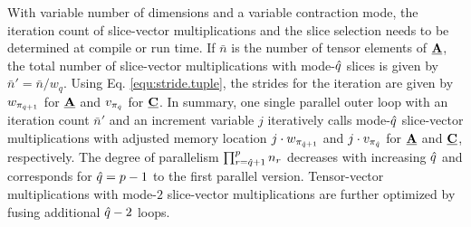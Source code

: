 With variable number of dimensions and a variable contraction mode, the iteration count of slice-vector multiplications and the slice selection needs to be determined at compile or run time.
If $\bar{n}$ is the number of tensor elements of $\underline{\mathbf{A}}$, the total number of slice-vector multiplications with mode-$\hat{q}$ slices is given by $\bar{n}' = \bar{n} / w_{q}$.
Using Eq. \eqref{equ:stride.tuple}, the strides for the iteration are given by $w_{\pi_{\hat{q}+1}}$ for $\underline{\mathbf{A}}$ and $v_{\pi_{\hat{q}}}$ for $\underline{\mathbf{C}}$.
In summary, one single parallel outer loop with an iteration count $\bar{n}'$ and an increment variable $j$ iteratively calls mode-$\hat{q}$ slice-vector multiplications with adjusted memory location $j \cdot w_{\pi_{\hat{q}+1}}$ and $j \cdot v_{\pi_{\hat{q}}}$ for $\underline{\mathbf{A}}$ and $\underline{\mathbf{C}}$, respectively.
The degree of parallelism $\prod_{r=\hat{q}+1}^p n_r$ decreases with increasing $\hat{q}$ and corresponds for $\hat{q} = p-1$ to the first parallel version. 
Tensor-vector multiplications with mode-$2$ slice-vector multiplications are further optimized by fusing additional $\hat{q}-2$ loops.


\begin{comment}
Then
\begin{equation}
\mbpsi = 
\begin{cases}
(1,2) & \text{if} \ \pi_1 < \pi_k\\
(2,1) & \text{otherwise.}
\end{cases}
\end{equation}
\end{comment}

